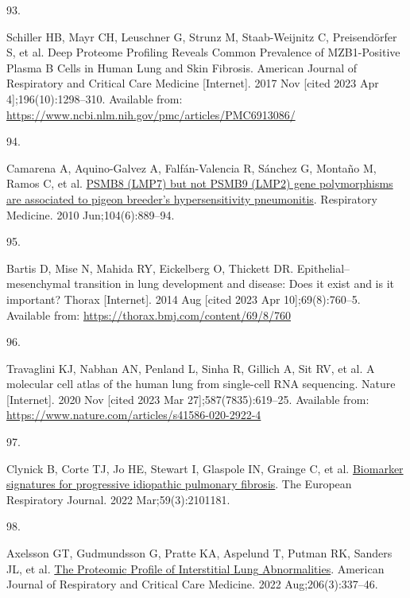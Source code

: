\documentclass[
]{article}
\newlength{\cslhangindent}
\newlength{\csllabelwidth}
\newlength{\cslentryspacingunit} %
\newenvironment{CSLReferences}[2] %
 {%
  \setlength{\parindent}{0pt}
  \ifodd #1
  \let\oldpar\par
  \def\par{\hangindent=\cslhangindent\oldpar}
  \fi
  \setlength{\parskip}{#2\cslentryspacingunit}
 }%
 {}
\newcommand{\CSLLeftMargin}[1]{\parbox[t]{\csllabelwidth}{#1}}
\newcommand{\CSLRightInline}[1]{\parbox[t]{\linewidth - \csllabelwidth}{#1}\break}
\begin{document}
\begin{CSLReferences}{0}{0}
\leavevmode{}%
\CSLLeftMargin{93. }%
\CSLRightInline{Schiller HB, Mayr CH, Leuschner G, Strunz M, Staab-Weijnitz C, Preisendörfer S, et al. Deep {Proteome} {Profiling} {Reveals} {Common} {Prevalence} of {MZB1}-{Positive} {Plasma} {B} {Cells} in {Human} {Lung} and {Skin} {Fibrosis}. American Journal of Respiratory and Critical Care Medicine {[}Internet{]}. 2017 Nov {[}cited 2023 Apr 4{]};196(10):1298--310. Available from: \url{https://www.ncbi.nlm.nih.gov/pmc/articles/PMC6913086/}}

\leavevmode{}%
\CSLLeftMargin{94. }%
\CSLRightInline{Camarena A, Aquino-Galvez A, Falfán-Valencia R, Sánchez G, Montaño M, Ramos C, et al. \href{https://doi.org/10.1016/j.rmed.2010.01.014}{{PSMB8} ({LMP7}) but not {PSMB9} ({LMP2}) gene polymorphisms are associated to pigeon breeder's hypersensitivity pneumonitis}. Respiratory Medicine. 2010 Jun;104(6):889--94. }

\leavevmode{}%
\CSLLeftMargin{95. }%
\CSLRightInline{Bartis D, Mise N, Mahida RY, Eickelberg O, Thickett DR. Epithelial--mesenchymal transition in lung development and disease: Does it exist and is it important? Thorax {[}Internet{]}. 2014 Aug {[}cited 2023 Apr 10{]};69(8):760--5. Available from: \url{https://thorax.bmj.com/content/69/8/760}}

\leavevmode{}%
\CSLLeftMargin{96. }%
\CSLRightInline{Travaglini KJ, Nabhan AN, Penland L, Sinha R, Gillich A, Sit RV, et al. A molecular cell atlas of the human lung from single-cell {RNA} sequencing. Nature {[}Internet{]}. 2020 Nov {[}cited 2023 Mar 27{]};587(7835):619--25. Available from: \url{https://www.nature.com/articles/s41586-020-2922-4}}

\leavevmode{}%
\CSLLeftMargin{97. }%
\CSLRightInline{Clynick B, Corte TJ, Jo HE, Stewart I, Glaspole IN, Grainge C, et al. \href{https://doi.org/10.1183/13993003.01181-2021}{Biomarker signatures for progressive idiopathic pulmonary fibrosis}. The European Respiratory Journal. 2022 Mar;59(3):2101181. }

\leavevmode{}%
\CSLLeftMargin{98. }%
\CSLRightInline{Axelsson GT, Gudmundsson G, Pratte KA, Aspelund T, Putman RK, Sanders JL, et al. \href{https://doi.org/10.1164/rccm.202110-2296OC}{The {Proteomic} {Profile} of {Interstitial} {Lung} {Abnormalities}}. American Journal of Respiratory and Critical Care Medicine. 2022 Aug;206(3):337--46. }


\end{CSLReferences}
\end{document}
